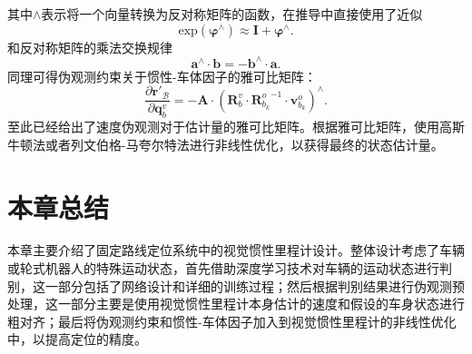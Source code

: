 其中${\land}$表示将一个向量转换为反对称矩阵的函数，在推导中直接使用了近似
\begin{equation}
  \text{exp}(\symbf{\varphi }^{\land}) \approx \symbf{I} + \symbf{\varphi }^{\land}.
\end{equation}
和反对称矩阵的乘法交换规律
\begin{equation}
  \symbf{a}^{\land} \cdot \symbf{b} = -\symbf{b}^{\land} \cdot \symbf{a}.
\end{equation}
同理可得伪观测约束关于惯性-车体因子的雅可比矩阵：
\begin{equation}
  \frac{\partial \symbf{r}'_{\mathcal{B}}}{\partial \symbf{q}_{b}^v} = -\symbf{A} \cdot (\symbf{R}_b^v \cdot {\symbf{R}_{b_k}^o}^{-1} \cdot \symbf{v}_{b_k}^o)^{\land}.
  \label{eq:JrJqv}
\end{equation}
至此已经给出了速度伪观测对于估计量的雅可比矩阵。根据雅可比矩阵，使用高斯牛顿法或者列文伯格-马夸尔特法进行非线性优化，以获得最终的状态估计量。

\section{本章总结}
本章主要介绍了固定路线定位系统中的视觉惯性里程计设计。整体设计考虑了车辆或轮式机器人的特殊运动状态，首先借助深度学习技术对车辆的运动状态进行判别，这一部分包括了网络设计和详细的训练过程；然后根据判别结果进行伪观测预处理，这一部分主要是使用视觉惯性里程计本身估计的速度和假设的车身状态进行粗对齐；最后将伪观测约束和惯性-车体因子加入到视觉惯性里程计的非线性优化中，以提高定位的精度。